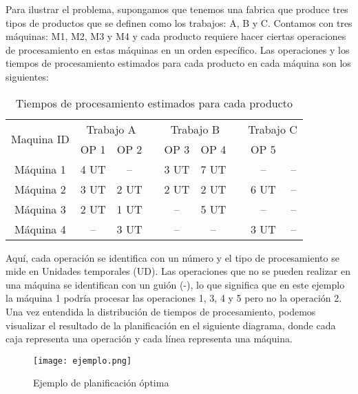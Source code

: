 Para ilustrar el problema, supongamos que tenemos una fabrica que produce tres tipos de productos
que se definen como los trabajos: A, B y C. Contamos con tres máquinas: M1, M2, M3 y M4 
y cada producto requiere hacer ciertas operaciones de procesamiento en estas máquinas en 
un orden específico. Las operaciones y los tiempos de procesamiento estimados para cada 
producto en cada máquina son los siguientes: 

\begin{table}[ht]
    \caption{Tiempos de procesamiento estimados para cada producto} 
    \centering 
    \begin{tabular}{ccccccccc}  

    \toprule
    \multirow{2}{*}{\parbox[c]{.2\linewidth}{\centering Maquina ID}} & 
    \multicolumn{2}{c}{Trabajo A} && 
    \multicolumn{2}{c}{Trabajo B} && 
    \multicolumn{2}{c}{Trabajo C} \\ 

    \cmidrule{2-3} \cmidrule{5-6} \cmidrule{8-9}
     & {\centering OP 1} & {OP 2} && {OP 3} & {OP 4} && {OP 5}\\

    \midrule
    Máquina 1 & 4 UT & --   && 3 UT & 7 UT && --   & -- \\
    Máquina 2 & 3 UT & 2 UT && 2 UT & 2 UT && 6 UT & -- \\
    Máquina 3 & 2 UT & 1 UT && --   & 5 UT && --   & -- \\  
    Máquina 4 & --   & 3 UT && --   & --   && 3 UT & -- \\ 
    \bottomrule
    
    \end{tabular}
\end{table}

\medskip

Aquí, cada operación se identifica con un número y el tipo de procesamiento se mide en Unidades temporales
(UD). Las operaciones que no se pueden realizar en una máquina se identifican con un guión (-), lo que 
significa que en este ejemplo la máquina 1 podría procesar las operaciones 1, 3, 4 y 5 pero 
no la operación 2. Una vez entendida la distribución de tiempos de procesamiento, podemos visualizar
el resultado de la planificación en el siguiente diagrama, donde cada caja representa una operación 
y cada línea representa una máquina.

\begin{figure}[ht]
    \centering
    \texttt{[image: ejemplo.png]}
    \caption{Ejemplo de planificación óptima}
    \label{fig:example-solution}
\end{figure}

